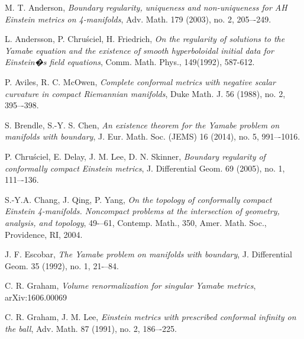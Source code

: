 \documentclass{amsart}
\theoremstyle{definition}
\theoremstyle{remark}
\numberwithin{equation}{section}
\begin{document}
%
%
%
\begin{thebibliography}{s}
%
%
%
%

 M. T. Anderson, \emph{Boundary regularity, uniqueness and non-uniqueness for AH Einstein metrics on 4-manifolds}, Adv. Math. 179 (2003), no. 2, 205–-249.


 L. Andersson, P. Chru\'sciel, H. Friedrich, \emph{On the regularity of solutions to the Yamabe equation and the existence of
smooth hyperboloidal initial data for Einstein�s field equations}, Comm. Math. Phys., 149(1992), 587-612.



 P. Aviles, R. C. McOwen, \emph{Complete conformal metrics with negative scalar curvature in compact Riemannian manifolds}, Duke Math. J. 56 (1988), no. 2, 395–-398.

 S. Brendle, S.-Y. S. Chen, \emph{An existence theorem for the Yamabe problem on manifolds with boundary},
J. Eur. Math. Soc. (JEMS) 16 (2014), no. 5, 991–-1016.


 P. Chru\'sciel, E. Delay, J. M. Lee, D. N. Skinner, \emph{Boundary regularity of conformally compact Einstein metrics},
J. Differential Geom. 69 (2005), no. 1, 111–-136.

 S.-Y.A. Chang, J. Qing, P. Yang, \emph{On the topology of conformally compact Einstein 4-manifolds. Noncompact problems at the intersection of geometry, analysis, and topology}, 49-–61, Contemp. Math., 350, Amer. Math. Soc., Providence, RI, 2004.

 J. F. Escobar, \emph{The Yamabe problem on manifolds with boundary}, J. Differential Geom. 35 (1992), no. 1, 21-–84.

 C. R. Graham, \emph{Volume renormalization for singular Yamabe metrics}, arXiv:1606.00069

 C. R. Graham, J. M. Lee, \emph{Einstein metrics with prescribed conformal infinity on the ball}, Adv. Math. 87 (1991), no. 2, 186–-225.


\end{thebibliography}
\end{document}
